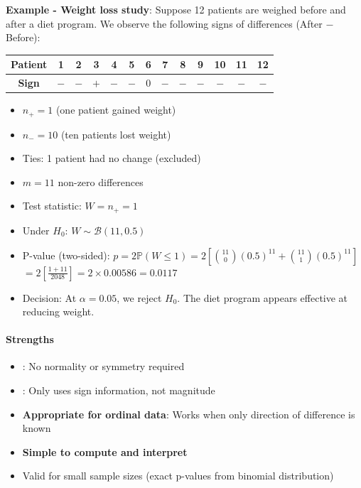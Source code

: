 \textbf{Example - Weight loss study}: Suppose 12 patients are weighed before and after a diet
program. We observe the following signs of differences (After $-$ Before):

\begin{center}
\begin{tabular}{|c|c|c|c|c|c|c|c|c|c|c|c|c|}
    \hline
    \textbf{Patient} & 1 & 2 & 3 & 4 & 5 & 6 & 7 & 8 & 9 & 10 & 11 & 12 \\
    \hline
    \textbf{Sign} & $-$ & $-$ & $+$ & $-$ & $-$ & $0$ & $-$ & $-$ & $-$ & $-$ & $-$ & $-$ \\
    \hline
\end{tabular}
\end{center}

\begin{itemize}
    \item $n_+ = 1$ (one patient gained weight)
    \item $n_- = 10$ (ten patients lost weight)
    \item Ties: 1 patient had no change (excluded)
    \item $m = 11$ non-zero differences
    \item Test statistic: $W = n_+ = 1$
    \item Under $H_0$: $W \sim \mathcal{B}(11, 0.5)$
    \item P-value (two-sided): $p = 2\mathbb{P}(W \leq 1) = 2\left[\binom{11}{0}(0.5)^{11} + \binom{11}{1}(0.5)^{11}\right]$
        $= 2\left[\frac{1 + 11}{2048}\right] = 2 \times 0.00586 = 0.0117$
    \item Decision: At $\alpha = 0.05$, we reject $H_0$. The diet program appears effective
        at reducing weight.
\end{itemize}

\paragraph{Strengths}
\begin{itemize}
    \item {}: No normality or symmetry required
    \item {}: Only uses sign information, not magnitude
    \item \textbf{Appropriate for ordinal data}: Works when only direction of difference is known
    \item \textbf{Simple to compute and interpret}
    \item Valid for small sample sizes (exact p-values from binomial distribution)
\end{itemize}

